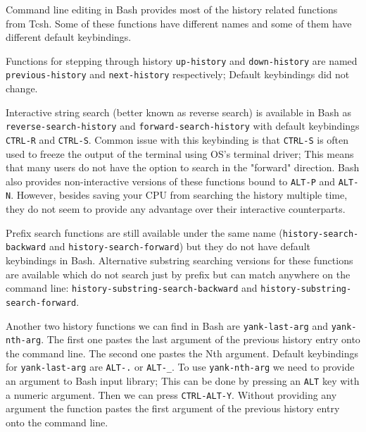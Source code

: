 \documentclass[thesis=M,english]{FITthesis}[2012/10/20]
\begin{document}
Command line editing in Bash provides most of the history related functions from Tcsh. Some of these functions have different names and some of them have different default keybindings.

Functions for stepping through history \verb|up-history| and \verb|down-history| are named \verb|previous-history| and \verb|next-history| respectively; Default keybindings did not change. 

Interactive string search (better known as reverse search) is available in Bash as \verb|reverse-search-history| and \verb|forward-search-history| with default keybindings \verb|CTRL-R| and \verb|CTRL-S|. 
Common issue with this keybinding is that \verb|CTRL-S| is often used to freeze the output of the terminal using OS's terminal driver; This means that many users do not have the option to search in the "forward" direction.   
Bash also provides non-interactive versions of these functions bound to \verb|ALT-P| and \verb|ALT-N|. However, besides saving your CPU from searching the history multiple time, they do not seem to provide any advantage over their interactive counterparts. 

Prefix search functions are still available under the same name (\verb|history-search-backward|  and \verb|history-search-forward|) but they do not have default keybindings in Bash. Alternative substring searching versions for these functions are available which do not search just by prefix but can match anywhere on the command line: \verb|history-substring-search-backward| and \verb|history-substring-search-forward|.

Another two history functions we can find in Bash are \verb|yank-last-arg| and \verb|yank-nth-arg|. The first one pastes the last argument of the previous history entry onto the command line. The second one pastes the Nth argument. Default keybindings for \verb|yank-last-arg| are \verb|ALT-.| or \verb|ALT-_|. To use \verb|yank-nth-arg| we need to provide an argument to Bash input library; This can be done by pressing an \verb|ALT| key with a numeric argument. Then we can press \verb|CTRL-ALT-Y|. Without providing any argument the function pastes the first argument of the previous history entry onto the command line.
\end{document}
